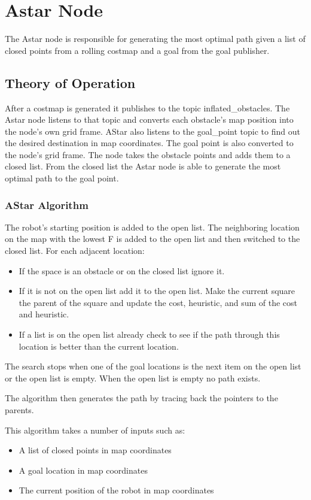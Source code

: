 \section{Astar Node}

The Astar node is responsible for generating the most optimal path given a list of closed points from a rolling costmap and a goal from the goal publisher.

\subsection{Theory of Operation}
After a costmap is generated it publishes to the topic inflated\_obstacles. The Astar node listens to that topic and converts each obstacle's map position into the node's own grid frame. AStar also listens to the goal\_point topic to find out the desired destination in map coordinates. The goal point is also converted to the node's grid frame. The node takes the obstacle points and adds them to a closed list. From the closed list the Astar node is able to generate the most optimal path to the goal point.


\subsubsection{AStar Algorithm}
The robot's starting position is added to the open list. The neighboring location on the map with the lowest F is added to the open list and then switched to the closed list. For each adjacent location:

\begin{itemize} 
\item If the space is an obstacle or on the closed list ignore it.
\item If it is not on the open list add it to the open list. Make the current square the parent of the square and update the cost, heuristic, and sum of the cost and heuristic.
\item If a list is on the open list already check to see if the path through this location is better than the current location.
\end{itemize}

The search stops when one of the goal locations is the next item on the open list or the open list is empty. When the open list is empty no path exists.

The algorithm then generates the path by tracing back the pointers to the parents.

 This algorithm takes a number
of inputs such as:
\begin{itemize}
\item
  A list of closed points in map coordinates
\item
  A goal location in map coordinates
\item
  The current position of the robot in map coordinates
\end{itemize}



